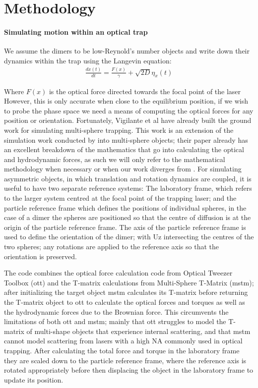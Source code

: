 \documentclass[preprint,  3p]{elsarticle}
\begin{document}
\newpage


\section{Methodology}
\paragraph{Simulating motion within an optical trap}
We assume the dimers to be low-Reynold’s number objects and write down their dynamics within the trap using the Langevin equation:
\begin{align}
	\label{eq:langevin}
	\frac{dx(t)}{dt}=\frac{F(x)}{\gamma}+\sqrt{2D}\eta_x(t)
\end{align}

Where $F(x)$ is the optical force directed towards the focal point of the laser However, this is only accurate when close to the equilibrium position, if we wish to probe the phase space we need a means of computing the optical forces for any position or orientation. Fortunately, Vigilante et al \cite{Vigilante_2020} have already built the ground work for simulating multi-sphere trapping. This work is an extension of the simulation work conducted by \cite{Vigilante_2020} into multi-sphere objects; their paper already has an excellent breakdown of the mathematics that go into calculating the optical and hydrodynamic forces, as such we will only refer to the mathematical methodology when necessary or when our work diverges from \cite{Vigilante_2020}. For simulating asymmetric objects, in which translation and rotation dynamics are coupled, it is useful to have two separate reference systems: The laboratory frame, which refers to the larger system centred at the focal point of the trapping laser; and the particle reference frame which defines the positions of individual spheres, in the case of a dimer the spheres are positioned so that the centre of diffusion is at the origin of the particle reference frame. The axis of the particle reference frame is used to define the orientation of the dimer; with Uz intersecting the centres of the two spheres; any rotations are applied to the reference axis so that the orientation is preserved.

The code combines the optical force calculation code from Optical Tweezer Toolbox (ott) and the T-matrix calculations from Multi-Sphere T-Matrix (mstm); after initializing the target object mstm calculates its T-matrix before returning the T-matrix object to ott to calculate the optical forces and torques as well as the hydrodynamic forces due to the Brownian force. This circumvents the limitations of both ott and mstm; mainly that ott struggles to model the T-matrix of multi-shape objects that experience internal scattering, and that mstm cannot model scattering from lasers with a high NA commonly used in optical trapping. After calculating the total force and torque in the laboratory frame they are scaled down to the particle reference frame, where the reference axis is rotated appropriately before then displacing the object in the laboratory frame to update its position.  
\end{document}

